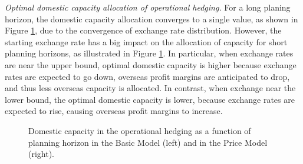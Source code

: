 \documentclass[mnsc,nonblindrev,copyedit]{informs2_wz} %
\begin{document}
{{\noindent \em Optimal domestic capacity allocation of operational hedging.} For a long planing horizon, the domestic capacity allocation converges to a single value, as shown in Figure \ref{fig:StExCap}, due to the convergence of exchange rate distribution.  However, the starting exchange rate has a big impact on the allocation of capacity for short planning horizons, as illustrated in Figure \ref{fig:StExCap}.  In particular, when exchange rates are near the upper bound, optimal domestic capacity is higher because exchange rates are expected to go down, overseas profit margins are anticipated to drop, and thus less overseas capacity is allocated.  In contrast, when exchange near the lower bound, the optimal domestic capacity is lower, because exchange rates are expected to rise, causing overseas profit margins to increase.
\begin{figure}[ht]
\begin{center}
\begin{minipage}{6in}
    \begin{minipage}{3.1in}
        \epsfxsize=2.8in
    \hspace{-0.5in}    
    \end{minipage}
    \begin{minipage}{2.8in}
        \epsfxsize=2.8in
    \hspace{-0.5in}    
    \end{minipage}
\end{minipage}
\vspace{.05in} \caption{Domestic capacity in the operational hedging as a function of planning horizon in the Basic Model (left) and in the Price Model (right).}\label{fig:StExCap}
\vspace{-.2in}
\end{center}
\end{figure}


}
\end{document}
